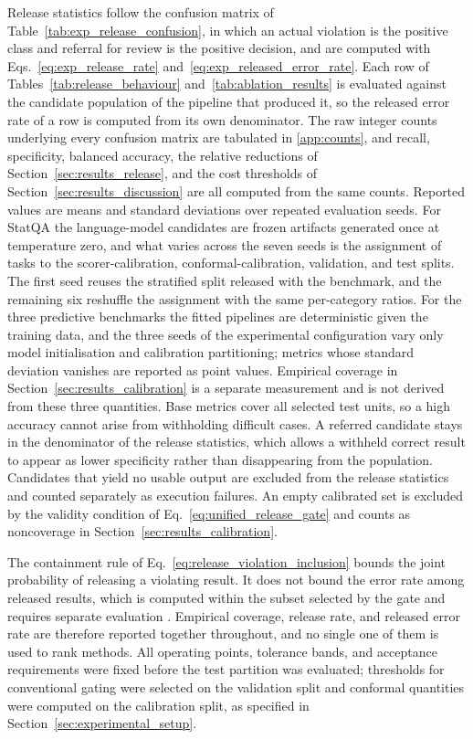 \documentclass[preprint,12pt,authoryear]{elsarticle}
\begin{document}
Release statistics follow the confusion matrix of Table~\ref{tab:exp_release_confusion}, in which an actual violation is the positive class and referral for review is the positive decision, and are computed with Eqs.~\eqref{eq:exp_release_rate} and~\eqref{eq:exp_released_error_rate}.
Each row of Tables~\ref{tab:release_behaviour} and~\ref{tab:ablation_results} is evaluated against the candidate population of the pipeline that produced it, so the released error rate of a row is computed from its own denominator.
The raw integer counts underlying every confusion matrix are tabulated in \ref{app:counts}, and recall, specificity, balanced accuracy, the relative reductions of Section~\ref{sec:results_release}, and the cost thresholds of Section~\ref{sec:results_discussion} are all computed from the same counts.
Reported values are means and standard deviations over repeated evaluation seeds.
For StatQA the language-model candidates are frozen artifacts generated once at temperature zero, and what varies across the seven seeds is the assignment of tasks to the scorer-calibration, conformal-calibration, validation, and test splits. The first seed reuses the stratified split released with the benchmark, and the remaining six reshuffle the assignment with the same per-category ratios.
For the three predictive benchmarks the fitted pipelines are deterministic given the training data, and the three seeds of the experimental configuration vary only model initialisation and calibration partitioning; metrics whose standard deviation vanishes are reported as point values.
Empirical coverage in Section~\ref{sec:results_calibration} is a separate measurement and is not derived from these three quantities.
Base metrics cover all selected test units, so a high accuracy cannot arise from withholding difficult cases.
A referred candidate stays in the denominator of the release statistics, which allows a withheld correct result to appear as lower specificity rather than disappearing from the population.
Candidates that yield no usable output are excluded from the release statistics and counted separately as execution failures.
An empty calibrated set is excluded by the validity condition of Eq.~\eqref{eq:unified_release_gate} and counts as noncoverage in Section~\ref{sec:results_calibration}.

The containment rule of Eq.~\eqref{eq:release_violation_inclusion} bounds the joint probability of releasing a violating result.
It does not bound the error rate among released results, which is computed within the subset selected by the gate and requires separate evaluation \citep{jin2025confidence}.
Empirical coverage, release rate, and released error rate are therefore reported together throughout, and no single one of them is used to rank methods.
All operating points, tolerance bands, and acceptance requirements were fixed before the test partition was evaluated; thresholds for conventional gating were selected on the validation split and conformal quantities were computed on the calibration split, as specified in Section~\ref{sec:experimental_setup}.
\end{document}
